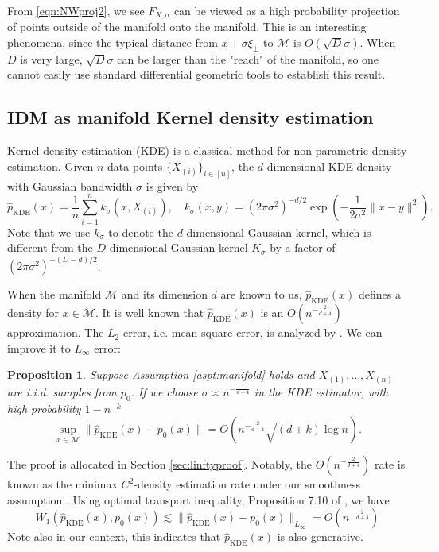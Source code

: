 \documentclass{article}
\newtheorem{pro}[theorem]{Proposition}
\def\phat{\hat{p}}
\def\Otilde{\widetilde{O}}
\def\calM{\mathcal{M}}
\begin{document}
From \eqref{eqn:NWproj2}, we see $F_{X,\sigma}$ can be viewed as a  high probability projection of points outside of the manifold onto the manifold. This is an interesting phenomena, since the typical distance from $x+\sigma\xi_\bot$ to $\calM$ is $O(\sqrt{D}\sigma)$. When $D$ is very large, $\sqrt{D}\sigma$ can be larger than the "reach" of the manifold, so one cannot easily use standard differential geometric tools to establish this result.  

\subsection{IDM as manifold Kernel density estimation}
Kernel density estimation (KDE) is a classical method for non parametric density estimation. Given $n$ data points $\{X_{(i)}\}_{i\in [n]}$, the $d$-dimensional KDE density with Gaussian bandwidth $\sigma$ is given by 
\[
\phat_{\text{KDE}}(x)=\frac1n\sum\limits_{i=1}^n k_\sigma(x, X_{(i)}),\quad 
k_{\sigma}(x,y)=(2\pi \sigma^2)^{-d/2} \exp\left(-\frac{1}{2\sigma^2}\|x-y\|^2\right).
\] 
Note that we use $k_\sigma$ to denote the $d$-dimensional Gaussian kernel, which is different from the $D$-dimensional Gaussian kernel $K_\sigma$ by a factor of $(2\pi \sigma^2)^{-(D-d)/2}$.

When the manifold $\calM$ and its dimension $d$ are known to us, $\phat_{\text{KDE}}(x)$ defines a density for $x\in \calM$. It is well known that   $\phat_{\text{KDE}}(x)$ is an $O(n^{-\frac{2}{d+4}})$  approximation. The $L_2$ error, i.e. mean square error, is analyzed by \cite{ozakin2009submanifold}. We can improve it to $L_\infty$ error:
\begin{pro}
\label{prop:KDEp0}
Suppose Assumption \ref{aspt:manifold}  holds and $X_{(1)},\ldots, X_{(n)}$ are i.i.d. samples from $p_0$. 
If we choose $\sigma \asymp n^{-\frac{1}{d+4}}$ in the KDE estimator, with high probability $1-n^{-k}$
\[
\sup_{x\in \calM}\|\phat_{\text{KDE}}(x)-p_0(x)\|=O(n^{-\frac{2}{d+4}}\sqrt{(d+k)\log n}).
\]
\end{pro}
The proof is allocated in Section \ref{sec:linftyproof}.
Notably, the $O(n^{-\frac{2}{d+4}})$ rate is known as the minimax $C^2$-density estimation rate under our smoothness assumption \cite{tsybakov2009nonparametric}. Using optimal transport inequality, Proposition 7.10 of \cite {villani2021topics}, we have 
\[
W_1(\phat_{\text{KDE}}(x),p_0(x))\lesssim \|\phat_{\text{KDE}}(x)-p_0(x)\|_{L_\infty}=\Otilde(n^{-\frac{2}{d+4}}) 
\]
Note also in our context, this indicates that $\phat_{\text{KDE}}(x)$ is also generative.
\end{document}

